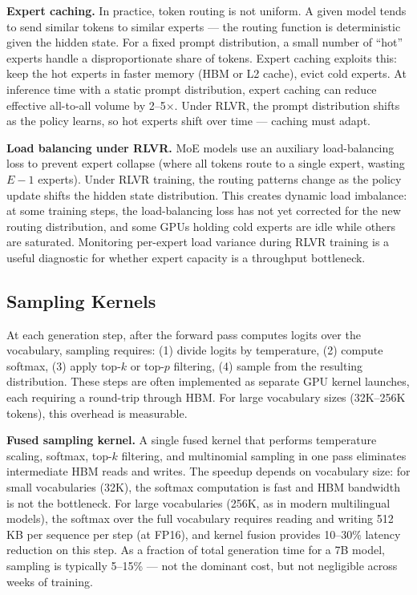 \textbf{Expert caching.} In practice, token routing is not uniform. A given model tends to send similar tokens to similar experts --- the routing function is deterministic given the hidden state. For a fixed prompt distribution, a small number of ``hot'' experts handle a disproportionate share of tokens. Expert caching exploits this: keep the hot experts in faster memory (HBM or L2 cache), evict cold experts. At inference time with a static prompt distribution, expert caching can reduce effective all-to-all volume by 2--5$\times$. Under RLVR, the prompt distribution shifts as the policy learns, so hot experts shift over time --- caching must adapt.

\textbf{Load balancing under RLVR.} MoE models use an auxiliary load-balancing loss to prevent expert collapse (where all tokens route to a single expert, wasting $E-1$ experts). Under RLVR training, the routing patterns change as the policy update shifts the hidden state distribution. This creates dynamic load imbalance: at some training steps, the load-balancing loss has not yet corrected for the new routing distribution, and some GPUs holding cold experts are idle while others are saturated. Monitoring per-expert load variance during RLVR training is a useful diagnostic for whether expert capacity is a throughput bottleneck.

\subsection{Sampling Kernels}

At each generation step, after the forward pass computes logits over the vocabulary, sampling requires: (1) divide logits by temperature, (2) compute softmax, (3) apply top-$k$ or top-$p$ filtering, (4) sample from the resulting distribution. These steps are often implemented as separate GPU kernel launches, each requiring a round-trip through HBM. For large vocabulary sizes (32K--256K tokens), this overhead is measurable.

\textbf{Fused sampling kernel.} A single fused kernel that performs temperature scaling, softmax, top-$k$ filtering, and multinomial sampling in one pass eliminates intermediate HBM reads and writes. The speedup depends on vocabulary size: for small vocabularies (32K), the softmax computation is fast and HBM bandwidth is not the bottleneck. For large vocabularies (256K, as in modern multilingual models), the softmax over the full vocabulary requires reading and writing 512 KB per sequence per step (at FP16), and kernel fusion provides 10--30\% latency reduction on this step. As a fraction of total generation time for a 7B model, sampling is typically 5--15\% --- not the dominant cost, but not negligible across weeks of training.

